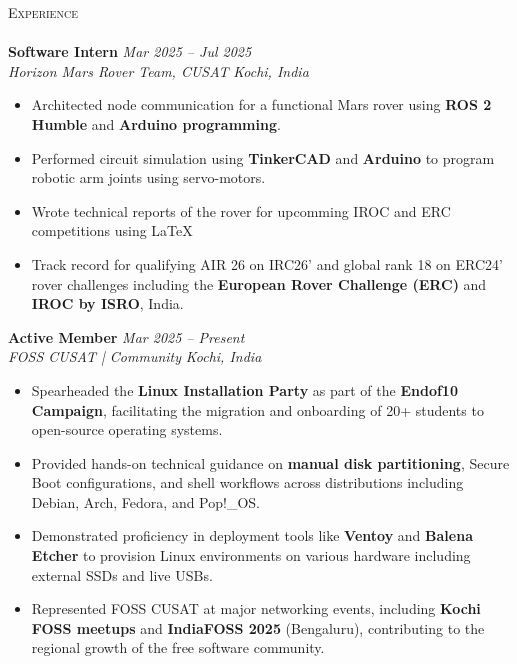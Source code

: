\documentclass[a4paper]{article}
\newcommand{\lineunder} {
    \vspace*{-8pt} \\
    \hspace*{-18pt} \hrulefill \\
}
\newcommand{\header} [1] {
    {\hspace*{-18pt}\vspace*{6pt} \textsc{#1}}
    \vspace*{-6pt} \lineunder
}
\begin{document}
\header{Experience}
\textbf{Software Intern} \hfill \textit{Mar 2025 -- Jul 2025} \\
\textit{Horizon Mars Rover Team, CUSAT} \hfill \textit{Kochi, India}
\begin{itemize}
    \item Architected node communication for a functional Mars rover using \textbf{ROS 2 Humble} and \textbf{Arduino programming}.
    \item Performed circuit simulation using \textbf{TinkerCAD} and \textbf{Arduino} to program robotic arm joints using servo-motors.
    \item Wrote technical reports of the rover for upcomming IROC and ERC competitions using \LaTeX\
    \item Track record for qualifying AIR 26 on IRC26' and global rank 18 on ERC24' rover challenges including the \textbf{European Rover Challenge (ERC)} and \textbf{IROC by ISRO}, India.
\end{itemize}

\textbf{Active Member} \hfill \textit{Mar 2025 -- Present} \\
\textit{FOSS CUSAT | Community} \hfill \textit{Kochi, India}
\begin{itemize}
    \item Spearheaded the \textbf{Linux Installation Party} as part of the \textbf{Endof10 Campaign}, facilitating the migration and onboarding of 20+ students to open-source operating systems.
    \item Provided hands-on technical guidance on \textbf{manual disk partitioning}, Secure Boot configurations, and shell workflows across distributions including Debian, Arch, Fedora, and Pop!\_OS.
    \item Demonstrated proficiency in deployment tools like \textbf{Ventoy} and \textbf{Balena Etcher} to provision Linux environments on various hardware including external SSDs and live USBs.
    \item Represented FOSS CUSAT at major networking events, including \textbf{Kochi FOSS meetups} and \textbf{IndiaFOSS 2025} (Bengaluru), contributing to the regional growth of the free software community.
\end{itemize}
\vspace*{4mm}
\end{document}
